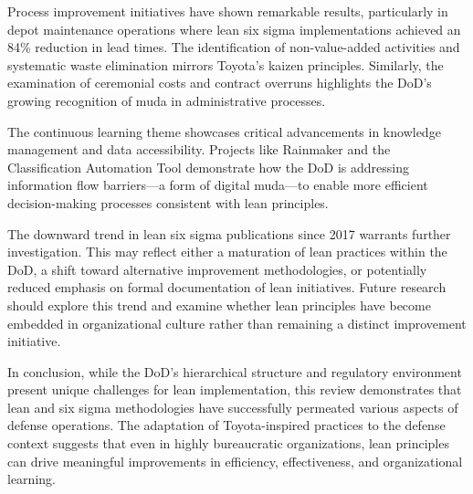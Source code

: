 \documentclass{article}
\begin{document}
	Process improvement initiatives have shown remarkable results, particularly in depot maintenance operations where lean six sigma implementations achieved an 84\% reduction in lead times. 
	The identification of non-value-added activities and systematic waste elimination mirrors Toyota's kaizen principles. 
	Similarly, the examination of ceremonial costs and contract overruns highlights the DoD's growing recognition of muda in administrative processes.

	The continuous learning theme showcases critical advancements in knowledge management and data accessibility.
	Projects like Rainmaker and the Classification Automation Tool demonstrate how the DoD is addressing information flow barriers—a form of digital muda—to enable more efficient decision-making processes consistent with lean principles.

	The downward trend in lean six sigma publications since 2017 warrants further investigation. 
	This may reflect either a maturation of lean practices within the DoD, a shift toward alternative improvement methodologies, or potentially reduced emphasis on formal documentation of lean initiatives. 
	Future research should explore this trend and examine whether lean principles have become embedded in organizational culture rather than remaining a distinct improvement initiative.

	In conclusion, while the DoD's hierarchical structure and regulatory environment present unique challenges for lean implementation, this review demonstrates that lean and six sigma methodologies have successfully permeated various aspects of defense operations. 
	The adaptation of Toyota-inspired practices to the defense context suggests that even in highly bureaucratic organizations, lean principles can drive meaningful improvements in efficiency, effectiveness, and organizational learning.

	\newpage

	
	\nocite{*}
	
\end{document}
